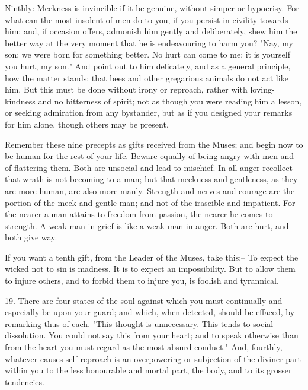 \documentclass{book}
\begin{document}
Ninthly: Meekness is invincible if it be genuine, without simper or
hypocrisy. For what can the most insolent of men do to you, if you
persist in civility towards him; and, if occasion offers, admonish him
gently and deliberately, shew him the better way at the very moment
that he is endeavouring to harm you? "Nay, my son; we were born for
something better. No hurt can come to me; it is yourself you hurt, my
son." And point out to him delicately, and as a general principle, how
the matter stands; that bees and other gregarious animals do not act
like him. But this must be done without irony or reproach, rather with
loving-kindness and no bitterness of spirit; not as though you were
reading him a lesson, or seeking admiration from any bystander, but as
if you designed your remarks for him alone, though others may be
present.

Remember these nine precepts as gifts received from the Muses; and
begin now to be human for the rest of your life. Beware equally of
being angry with men and of flattering them. Both are unsocial and
lead to mischief. In all anger recollect that wrath is not becoming to
a man; but that meekness and gentleness, as they are more human, are
also more manly. Strength and nerves and courage are the portion of
the meek and gentle man; and not of the irascible and impatient. For
the nearer a man attains to freedom from passion, the nearer he comes
to strength. A weak man in grief is like a weak man in anger. Both are
hurt, and both give way.

If you want a tenth gift, from the Leader of the Muses, take this:--
To expect the wicked not to sin is madness. It is to expect an
impossibility. But to allow them to injure others, and to forbid them
to injure you, is foolish and tyrannical.

19. There are four states of the soul against which you must
continually and especially be upon your guard; and which, when
detected, should be effaced, by remarking thus of each. "This thought
is unnecessary. This tends to social dissolution. You could not say
this from your heart; and to speak otherwise than from the heart you
must regard as the most absurd conduct." And, fourthly, whatever
causes self-reproach is an overpowering or subjection of the diviner
part within you to the less honourable and mortal part, the body, and
to its grosser tendencies.
\end{document}
